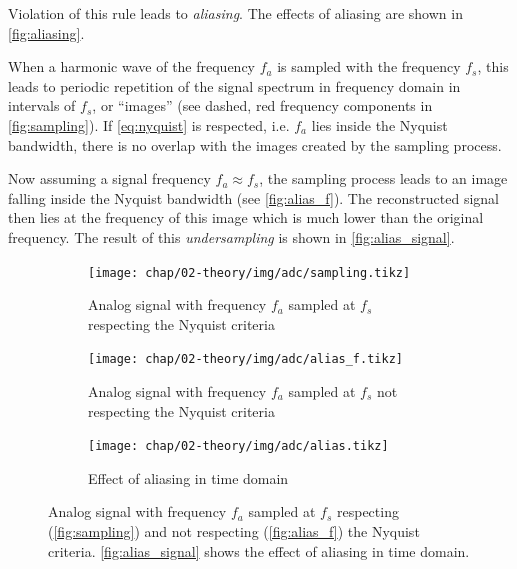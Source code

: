 Violation of this rule leads to \textit{aliasing}.
The effects of aliasing are shown in \autoref{fig:aliasing}.

When a harmonic wave of the frequency $f_a$ is sampled with the frequency $f_s$, this leads to periodic repetition of the signal spectrum in frequency domain in intervals of $f_s$, or ``images'' (see dashed, red frequency components in \autoref{fig:sampling}). 
If \autoref{eq:nyquist} is respected, i.e. $f_a$ lies inside the Nyquist bandwidth, there is no overlap with the images created by the sampling process.

Now assuming a signal frequency $f_a \approx f_s$, the sampling process leads to an image falling inside the Nyquist bandwidth (see \autoref{fig:alias_f}).
The reconstructed signal then lies at the frequency of this image which is much lower than the original frequency.
The result of this \textit{undersampling} is shown in \autoref{fig:alias_signal}. \cite{nyquist, shannon, walt}
\begin{figure}[tb]
	\centering
	\begin{subfigure}{\textwidth}
		\centering
		\texttt{[image: chap/02-theory/img/adc/sampling.tikz]}  
		\caption{Analog signal with frequency $f_a$ sampled at $f_s$ respecting the Nyquist criteria}
		\label{fig:sampling}
	\end{subfigure}
	\begin{subfigure}{\textwidth}
		\centering
		\texttt{[image: chap/02-theory/img/adc/alias\_f.tikz]} 
		\caption{Analog signal with frequency $f_a$ sampled at $f_s$ not respecting the Nyquist criteria}
		\label{fig:alias_f}
	\end{subfigure}
	\begin{subfigure}{\textwidth}
		\centering
		\texttt{[image: chap/02-theory/img/adc/alias.tikz]}  
		\caption{Effect of aliasing in time domain}
		\label{fig:alias_signal}
	\end{subfigure}

	\caption[Aliasing]{Analog signal with frequency $f_a$ sampled at $f_s$ respecting (\autoref{fig:sampling}) and not respecting (\autoref{fig:alias_f}) the Nyquist criteria. \autoref{fig:alias_signal} shows the effect of aliasing in time domain. \cite{walt}}
	\label{fig:alias}
\end{figure}



